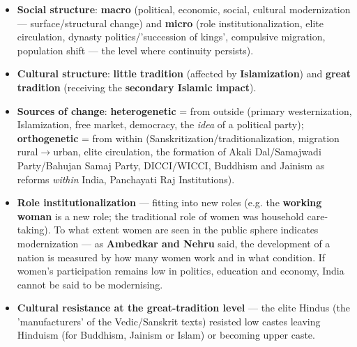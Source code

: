 \begin{ComparisonBox}
\begin{itemize}
\item \textbf{Social structure}: \textbf{macro} (political, economic, social, cultural modernization --- surface/structural change) and \textbf{micro} (role institutionalization, elite circulation, dynasty politics/'succession of kings', compulsive migration, population shift --- the level where continuity persists).
\item \textbf{Cultural structure}: \textbf{little tradition} (affected by \textbf{Islamization}) and \textbf{great tradition} (receiving the \textbf{secondary Islamic impact}).
\item \textbf{Sources of change}: \textbf{heterogenetic} = from outside (primary westernization, Islamization, free market, democracy, the \emph{idea} of a political party); \textbf{orthogenetic} = from within (Sanskritization/traditionalization, migration rural$\rightarrow$urban, elite circulation, the formation of Akali Dal/Samajwadi Party/Bahujan Samaj Party, DICCI/WICCI, Buddhism and Jainism as reforms \emph{within} India, Panchayati Raj Institutions).
\end{itemize}
\end{ComparisonBox}

\begin{KeyConcept}
\begin{itemize}
\item \textbf{Role institutionalization} --- fitting into new roles (e.g. the \textbf{working woman} is a new role; the traditional role of women was household care-taking). To what extent women are seen in the public sphere indicates modernization --- as \textbf{Ambedkar and Nehru} said, the development of a nation is measured by how many women work and in what condition. If women's participation remains low in politics, education and economy, India cannot be said to be modernising.
\item \textbf{Cultural resistance at the great-tradition level} --- the elite Hindus (the 'manufacturers' of the Vedic/Sanskrit texts) resisted low castes leaving Hinduism (for Buddhism, Jainism or Islam) or becoming upper caste.
\end{itemize}
\end{KeyConcept}

